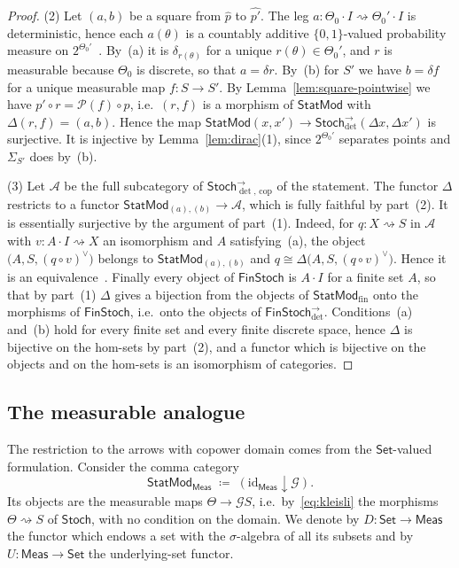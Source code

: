 \documentclass[11pt,a4paper]{article}
\theoremstyle{plain}
\theoremstyle{definition}
\theoremstyle{remark}
\newcommand{\cat}[1]{\mathsf{#1}}
\newcommand{\Meas}{\cat{Meas}}
\newcommand{\Set}{\cat{Set}}
\newcommand{\Stoch}{\cat{Stoch}}
\newcommand{\FinStoch}{\cat{FinStoch}}
\newcommand{\G}{\mathcal{G}}
\newcommand{\Prb}{\mathcal{P}}
\newcommand{\id}{\mathrm{id}}
\newcommand{\del}{\delta}
\newcommand{\StatMod}{\cat{StatMod}}
\newcommand{\Statk}{\StatMod_{\Meas}}
\newcommand{\Jc}{\Delta}
\newcommand{\Arrdet}[1]{#1^{\rightarrow}_{\det}}
\newcommand{\Arrcop}[1]{#1^{\rightarrow}_{\det,\,\mathrm{cop}}}
\begin{document}
\begin{proof}
(2) Let $(a,b)$ be a square from $\widehat p$ to $\widehat{p'}$. The leg
$a \colon \Theta_0 \cdot I \rightsquigarrow \Theta_0' \cdot I$ is
deterministic, hence each $a(\theta)$ is a countably additive
$\{0,1\}$-valued probability measure on
$2^{\Theta_0'}$~\cite[Ex.~10.4]{fritz_synthetic_2020}. By~(a) it is
$\delta_{r(\theta)}$ for a unique $r(\theta) \in \Theta_0'$, and $r$ is
measurable because $\Theta_0$ is discrete, so that $a = \del r$. By~(b) for
$S'$ we have $b = \del f$ for a unique measurable map $f \colon S \to S'$. By
Lemma~\ref{lem:square-pointwise} we have $p' \circ r = \Prb(f) \circ p$, i.e.\
$(r,f)$ is a morphism of $\StatMod$ with $\Jc(r,f) = (a,b)$. Hence the map
$\StatMod(x,x') \to \Arrdet{\Stoch}(\Jc x, \Jc x')$ is surjective. It is
injective by Lemma~\ref{lem:dirac}(1), since $2^{\Theta_0'}$ separates points
and $\Sigma_{S'}$ does by~(b).

(3) Let $\mathcal A$ be the full subcategory of $\Arrcop{\Stoch}$ of the
statement. The functor $\Jc$ restricts to a functor
$\StatMod_{(a),(b)} \to \mathcal A$, which is fully faithful by part~(2). It is
essentially surjective by the argument of part~(1). Indeed, for
$q \colon X \rightsquigarrow S$ in $\mathcal A$ with
$v \colon A \cdot I \rightsquigarrow X$ an isomorphism and $A$
satisfying~(a), the object $\bigl(A,S,(q \circ v)^{\vee}\bigr)$ belongs to
$\StatMod_{(a),(b)}$ and
$q \cong \Jc\bigl(A,S,(q \circ v)^{\vee}\bigr)$. Hence it is an
equivalence~\cite[IV.4, Thm.~1(iii)]{maclane_categories_1998}. Finally every
object of $\FinStoch$ is $A \cdot I$ for a finite set $A$, so that by
part~(1) $\Jc$ gives a bijection from the objects of $\StatMod_{\mathrm{fin}}$
onto the morphisms of $\FinStoch$, i.e.\ onto the objects of
$\Arrdet{\FinStoch}$. Conditions~(a) and~(b) hold for every finite set and
every finite discrete space, hence $\Jc$ is bijective on the hom-sets by
part~(2), and a functor which is bijective on the objects and on the hom-sets
is an isomorphism of categories.
\end{proof}

\subsection{The measurable analogue}

The restriction to the arrows with copower domain comes from the
$\Set$-valued formulation. Consider the comma category
\[
\Statk \;\coloneqq\; (\id_{\Meas}\downarrow\G).
\]
Its objects are the measurable maps $\Theta \to \G S$, i.e.\ by~\eqref{eq:kleisli} the morphisms
$\Theta \rightsquigarrow S$ of $\Stoch$, with no condition on the domain. We
denote by $D \colon \Set \to \Meas$ the functor which endows a set with the
$\sigma$-algebra of all its subsets and by $U \colon \Meas \to \Set$ the
underlying-set functor.
\end{document}
